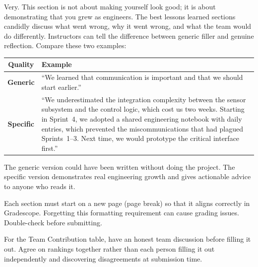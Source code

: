 \begin{faqbox}
Very. This section is not about making yourself look good; it is about demonstrating that you grew as engineers. The best lessons learned sections candidly discuss what went wrong, why it went wrong, and what the team would do differently. Instructors can tell the difference between generic filler and genuine reflection. Compare these two examples:

\begin{center}
\renewcommand{\arraystretch}{1.3}
\begin{tabularx}{0.95\textwidth}{>{\bfseries\color{warnred}}c >{\raggedright\arraybackslash}X}
\toprule
\textbf{Quality} & \textbf{Example} \\
\midrule
\textcolor{warnred}{Generic} & ``We learned that communication is important and that we should start earlier.'' \\
\textcolor{tipgreen}{Specific} & ``We underestimated the integration complexity between the sensor subsystem and the control logic, which cost us two weeks. Starting in Sprint~4, we adopted a shared engineering notebook with daily entries, which prevented the miscommunications that had plagued Sprints~1--3. Next time, we would prototype the critical interface first.'' \\
\bottomrule
\end{tabularx}
\end{center}

\noindent The generic version could have been written without doing the project. The specific version demonstrates real engineering growth and gives actionable advice to anyone who reads it.
\end{faqbox}

\begin{warnbox}
Each section must start on a new page (page break) so that it aligns correctly in Gradescope. Forgetting this formatting requirement can cause grading issues. Double-check before submitting.
\end{warnbox}

\begin{tipbox}
For the Team Contribution table, have an honest team discussion before filling it out. Agree on rankings together rather than each person filling it out independently and discovering disagreements at submission time.
\end{tipbox}

